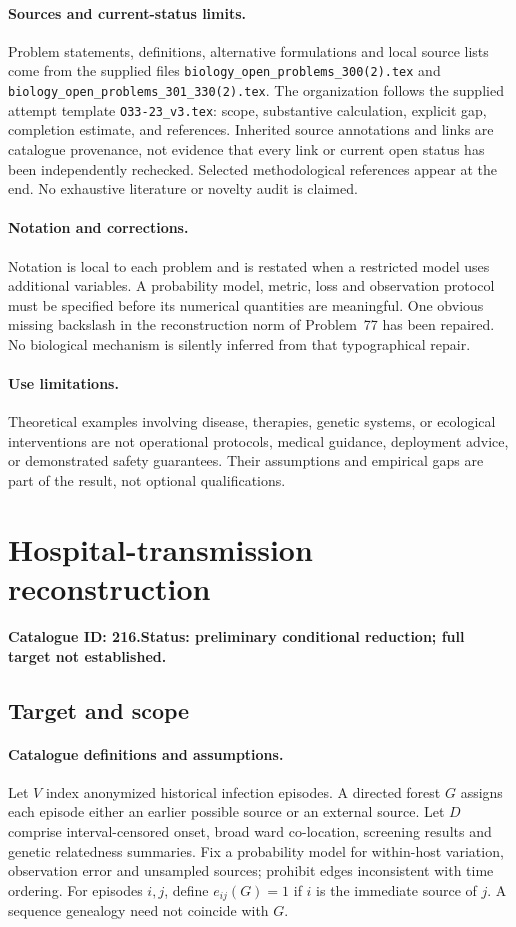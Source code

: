 \documentclass[11pt]{article}
\begin{document}
\paragraph{Sources and current-status limits.}
Problem statements, definitions, alternative formulations and local source lists
come from the supplied files
\texttt{biology\_open\_problems\_300(2).tex} and
\texttt{biology\_open\_problems\_301\_330(2).tex}.
The organization follows the supplied attempt template
\texttt{O33-23\_v3.tex}: scope, substantive calculation, explicit gap,
completion estimate, and references. Inherited source annotations and links are
catalogue provenance, not evidence that every link or current open status has
been independently rechecked. Selected methodological references appear at the
end. No exhaustive literature or novelty audit is claimed.

\paragraph{Notation and corrections.}
Notation is local to each problem and is restated when a restricted model uses
additional variables. A probability model, metric, loss and observation protocol
must be specified before its numerical quantities are meaningful. One obvious
missing backslash in the reconstruction norm of Problem~77 has been repaired.
No biological mechanism is silently inferred from that typographical repair.

\paragraph{Use limitations.}
Theoretical examples involving disease, therapies, genetic systems, or ecological
interventions are not operational protocols, medical guidance, deployment advice,
or demonstrated safety guarantees. Their assumptions and empirical gaps are part
of the result, not optional qualifications.

\setcounter{section}{215}
\section{Hospital-transmission reconstruction}
\label{prob:216}
\noindent\textbf{Catalogue ID: 216.}\quad \textbf{Status: preliminary conditional reduction; full target not established.}
\subsection{Target and scope}
\paragraph{Catalogue definitions and assumptions.}
Let $V$ index anonymized historical infection episodes. A directed forest $G$ assigns each episode either an earlier possible source or an external source. Let $D$ comprise interval-censored onset, broad ward co-location, screening results and genetic relatedness summaries. Fix a probability model for within-host variation, observation error and unsampled sources; prohibit edges inconsistent with time ordering. For episodes $i,j$, define $e_{ij}(G)=1$ if $i$ is the immediate source of $j$. A sequence genealogy need not coincide with $G$.
\end{document}
